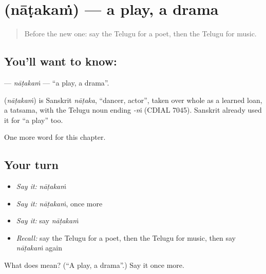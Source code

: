 \section[\texorpdfstring{\te{నాటకం} (nāṭakaṁ)}{నాటకం (nāṭakaṁ)}]{ (nāṭakaṁ) — a play, a drama}

\label{lesson:TE-C275-natakam}



\begin{quote}
Before the new one: say the Telugu for a poet, then the Telugu for music.
\end{quote}

\subsection*{You'll want to know: }
\textbf{} — \emph{nāṭakaṁ} — \textquotedblleft{}a play, a drama\textquotedblright{}.

\begin{cousinweb}
\textbf{} (\emph{nāṭakaṁ}) is Sanskrit \emph{nāṭaka}, \textquotedblleft{}dancer, actor\textquotedblright{}, taken over whole as a learned loan, a tatsama, with the Telugu noun ending \emph{-ṁ} (CDIAL 7045). Sanskrit already used it for \textquotedblleft{}a play\textquotedblright{} too.
\end{cousinweb}

\begin{grammarlens}[title={What you've built}]
One more word for this chapter.
\end{grammarlens}

\subsection*{Your turn}
\begin{itemize}
\raggedright
  \item \emph{Say it:} \emph{nāṭakaṁ}
  \item \emph{Say it:} \emph{nāṭakaṁ}, once more
  \item \emph{Say it:} say \emph{nāṭakaṁ}
  \item \emph{Recall:} say the Telugu for a poet, then the Telugu for music, then say \emph{nāṭakaṁ} again
\end{itemize}

\begin{tcolorbox}[breakable,colback=teal!4,colframe=teal!35!black,title={Before you move on}]
What does  mean? (\textquotedblleft{}A play, a drama\textquotedblright{}.) Say it once more.
\end{tcolorbox}

